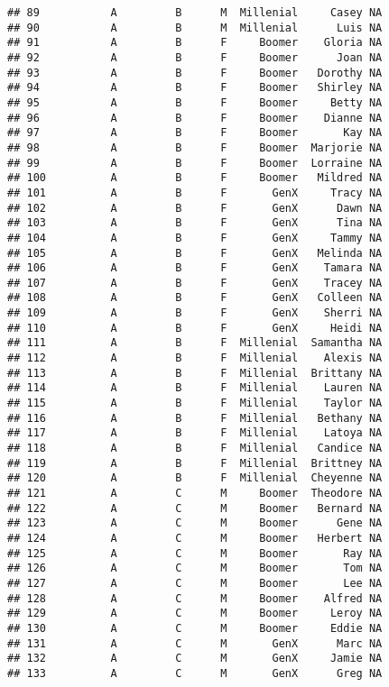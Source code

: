 \documentclass[
]{article}
\begin{document}
\begin{verbatim}
## 89           A         B      M  Millenial     Casey NA
## 90           A         B      M  Millenial      Luis NA
## 91           A         B      F     Boomer    Gloria NA
## 92           A         B      F     Boomer      Joan NA
## 93           A         B      F     Boomer   Dorothy NA
## 94           A         B      F     Boomer   Shirley NA
## 95           A         B      F     Boomer     Betty NA
## 96           A         B      F     Boomer    Dianne NA
## 97           A         B      F     Boomer       Kay NA
## 98           A         B      F     Boomer  Marjorie NA
## 99           A         B      F     Boomer  Lorraine NA
## 100          A         B      F     Boomer   Mildred NA
## 101          A         B      F       GenX     Tracy NA
## 102          A         B      F       GenX      Dawn NA
## 103          A         B      F       GenX      Tina NA
## 104          A         B      F       GenX     Tammy NA
## 105          A         B      F       GenX   Melinda NA
## 106          A         B      F       GenX    Tamara NA
## 107          A         B      F       GenX    Tracey NA
## 108          A         B      F       GenX   Colleen NA
## 109          A         B      F       GenX    Sherri NA
## 110          A         B      F       GenX     Heidi NA
## 111          A         B      F  Millenial  Samantha NA
## 112          A         B      F  Millenial    Alexis NA
## 113          A         B      F  Millenial  Brittany NA
## 114          A         B      F  Millenial    Lauren NA
## 115          A         B      F  Millenial    Taylor NA
## 116          A         B      F  Millenial   Bethany NA
## 117          A         B      F  Millenial    Latoya NA
## 118          A         B      F  Millenial   Candice NA
## 119          A         B      F  Millenial  Brittney NA
## 120          A         B      F  Millenial  Cheyenne NA
## 121          A         C      M     Boomer  Theodore NA
## 122          A         C      M     Boomer   Bernard NA
## 123          A         C      M     Boomer      Gene NA
## 124          A         C      M     Boomer   Herbert NA
## 125          A         C      M     Boomer       Ray NA
## 126          A         C      M     Boomer       Tom NA
## 127          A         C      M     Boomer       Lee NA
## 128          A         C      M     Boomer    Alfred NA
## 129          A         C      M     Boomer     Leroy NA
## 130          A         C      M     Boomer     Eddie NA
## 131          A         C      M       GenX      Marc NA
## 132          A         C      M       GenX     Jamie NA
## 133          A         C      M       GenX      Greg NA

\end{verbatim}
\end{document}
